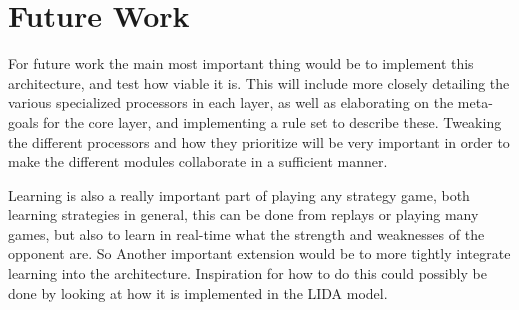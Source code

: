 \section{Future Work}
\label{sec:futurework}
For future work the main most important thing would be to implement this
architecture, and test how viable it is. This will include more closely
detailing the various specialized processors in each layer, as well as
elaborating on the meta-goals for the core layer, and implementing a rule set to
describe these. Tweaking the different processors and how they prioritize will
be very important in order to make the different modules collaborate in a
sufficient manner.  

Learning is also a really important part of playing any strategy game, both
learning strategies in general, this can be done from replays or playing many
games, but also to learn in real-time what the strength and weaknesses of the
opponent are. So Another important extension would be to more tightly integrate
learning into the architecture. Inspiration for how to do this could possibly be
done by looking at how it is implemented in the LIDA
model\cite{franklin2007lida}.